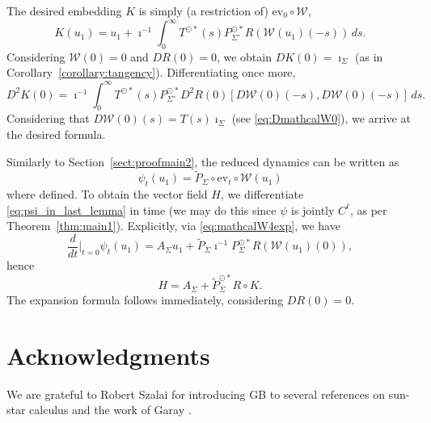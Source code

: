 \documentclass[a4paper, 12pt, oneside, reqno, notitlepage]{amsart}
\theoremstyle{plain}
\theoremstyle{definition}
\theoremstyle{remark}
\begin{document}
The desired embedding $K$ is simply (a restriction of) $\mathrm{ev}_0 \circ \mathcal{W}$,
\begin{displaymath}
    K(u_1) = u_1 + \imath^{-1}\int_0^\infty T^{\odot *} (s) P_{\Sigma'}^{\odot *} R(\mathcal{W}(u_1)(-s)) \, ds.
\end{displaymath}
Considering $\mathcal{W}(0) = 0$ and $DR(0) = 0$, we obtain $DK(0) = \imath_\Sigma$ (as in Corollary~\ref{corollary:tangency}).
Differentiating once more,
\begin{displaymath}
    D^2K(0) = \imath^{-1}\int_0^\infty T^{\odot *} (s) P_{\Sigma'}^{\odot *} D^2R(0)[D\mathcal{W}(0)(-s),D\mathcal{W}(0)(-s)] \, ds.
\end{displaymath}
Considering that $D\mathcal{W}(0) (s) = T(s) \imath_\Sigma$ (see \eqref{eq:DmathcalW0}), we arrive at the desired formula.

Similarly to Section~\ref{sect:proofmain2}, the reduced dynamics can be written as
\begin{equation}
    \psi_t (u_1) = \widetilde{P}_\Sigma \circ \mathrm{ev}_t \circ \mathcal{W}(u_1)
    \label{eq:psi_in_last_lemma}
\end{equation}
where defined.
To obtain the vector field $H$, we differentiate \eqref{eq:psi_in_last_lemma} in time (we may do this since $\psi$ is jointly $C^\ell$, as per Theorem~\ref{thm:main1}).
Explicitly, via \eqref{eq:mathcalW4exp}, we have
\begin{displaymath}
     \frac{d}{dt} \Big|_{t = 0} \psi_t(u_1) = A_\Sigma u_1  + \widetilde{P}_\Sigma \imath^{-1} P_\Sigma^{\odot *} R (\mathcal{W}(u_1)(0)),
\end{displaymath}
hence
\begin{displaymath}
    H = A_\Sigma +  \widetilde{P}_\Sigma^{\odot *} R \circ K .
\end{displaymath}
The expansion formula follows immediately, considering $DR(0) = 0$.


\section*{Acknowledgments}
We are grateful to Robert Szalai for introducing GB to several references on sun-star calculus and the work of Garay \cite{garay2005brief}.

    

\printbibliography
\end{document}
